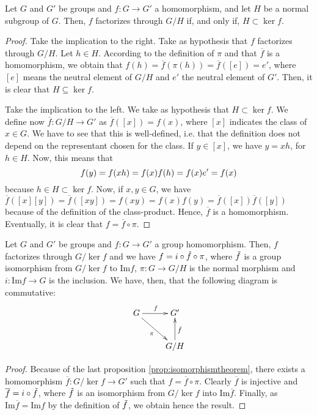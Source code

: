 \documentclass[../main.tex]{subfiles}
\begin{document}
\begin{prop}\label{prop:isomorphismtheorem}
Let $G$ and $G'$ be groups and $f:G\rightarrow G'$ a homomorphism, and let $H$ be a normal subgroup of $G$. Then, $f$ factorizes through $G/H$ if, and only if, $H\subset \ker f$.
\end{prop}
\begin{proof}
Take the implication to the right. Take as hypothesis that $f$ factorizes through $G/H$. Let $h\in H$. According to the definition of $\pi$ and that $\overline{f}$ is a homomorphism, we obtain that $f(h) = \overline{f}(\pi(h)) = \overline{f}([e]) = e'$, where $[e]$ means the neutral element of $G/H$ and $e'$ the neutral element of $G'$. Then, it is clear that $H\subseteq \ker f$.

Take the implication to the left. We take as hypothesis that $H\subset \ker f$. We define now $\overline{f}:G/H\rightarrow G'$ as $\overline{f}([x]) = f(x)$, where $[x]$ indicates the class of $x\in G$. We have to see that this is well-defined, i.e. that the definition does not depend on the representant chosen for the class. If $y\in [x]$, we have $y = xh$, for $h\in H$. Now, this means that
\begin{equation}
    \notag
    f(y) = f(xh) = f(x)f(h) = f(x)e' = f(x)
\end{equation}
because $h\in H\subset \ker f$. Now, if $x,y\in G$, we have $\overline{f}([x][y]) = \overline{f}([xy]) = f(xy) = f(x)f(y) = \overline{f}([x])\overline{f}([y])$ because of the definition of the class-product. Hence, $\overline{f}$ is a homomorphism. Eventually, it is clear that $f = \overline{f}\circ \pi$.
\end{proof}

\begin{ter}
\label{ter:firstisomorphism} Let $G$ and $G'$ be groups and $f:G\rightarrow G'$ a group homomorphism. Then, $f$ factorizes through $G/\ker f$ and we have $f = i\circ \Tilde{f}\circ \pi$, where $\Tilde{f}$ is a group isomorphism from $G/\ker f$ to $\mathrm{Im}f$, $\pi:G\rightarrow G/H$ is the normal morphism and $i:\mathrm{Im}f \rightarrow G$ is the inclusion. We have, then, that the following diagram is commutative:
\begin{equation}
        \notag
        \xymatrix{
            G\ar[dr]_{\pi} \ar[r]^{f} & G'\\
            & G/H \ar[u]_{\Tilde{f}}
        }
\end{equation}
\end{ter}
\begin{proof}
Because of the last proposition \ref{prop:isomorphismtheorem}, there exists a homomorphism $\overline{f}:G/\ker f\rightarrow G'$ such that $f = \overline{f}\circ\pi$. Clearly $\overline{f}$ is injective and $\overline{f} = i\circ\Tilde{f}$, where $\Tilde{f}$ is an isomorphism from $G/\ker f$ into $\mathrm{Im}\overline{f}$. Finally, as $\mathrm{Im}\overline{f} = \mathrm{Im}f$ by the definition of $\Tilde{f}$, we obtain hence the result.
\end{proof}
\end{document}
